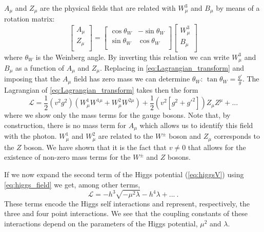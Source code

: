 $A_{\mu}$ and $Z_{\mu}$ are the physical fields that are related with $W^3_{\mu}$ and $B_{\mu}$ by means of a rotation matrix:
\begin{equation}
\begin{bmatrix}
A_{\mu} \\
Z_{\mu} \\
\end{bmatrix}=
\begin{bmatrix}
\cos\theta_W & -\sin\theta_W \\
\sin\theta_W & \cos\theta_W \\
\end{bmatrix}
\begin{bmatrix}
W^3_{\mu} \\
B_{\mu} \\
\end{bmatrix}
\end{equation}
where $\theta_W$ is the Weinberg angle.
By inverting this relation we can write $W^3_{\mu}$ and $B_{\mu}$ as a function of $A_{\mu}$ and $Z_{\mu}$. Replacing in \ref{eq:Lagrangian_transform} and imposing that the $A_{\mu}$ field has zero mass we can determine $\theta_W$: $\tan\theta_W=\frac{g'}{g}$. The Lagrangian of \ref{eq:Lagrangian_transform} takes then the form
\begin{equation}
	\mathcal{L}=\frac{1}{2}\left(v^2g^2\right)\left(W^1_{\mu}W^{1\mu}+W^2_{\mu}W^{2\mu}\right)+\frac{1}{2}\left(v^2\left[g^2+g'^2\right]\right)Z_{\mu}Z^{\mu}+...
\end{equation}
where we show only the mass terms for the gauge bosons. Note that, by construction, there is no mass term for $A_{\mu}$ which allows us to identify this field with the photon. $W^1_{\mu}$ and $W^2_{\mu}$ are related to the $W^{\pm}$ boson and $Z_{\mu}$ corresponds to the $Z$ boson. We have shown that it is the fact that $v\neq0$ that allows for the existence of non-zero mass terms for the $W^{\pm}$ and $Z$ bosons.

If we now expand the second term of the Higgs potential (\ref{eq:higgsV}) using \ref{eq:higgs_field} we get, among other terms,
\begin{equation}
\mathcal{L}=-h^3\sqrt{-\mu^2 \lambda} - h^4\lambda+...~.
\label{eq:higgs_couplings}
\end{equation}
These terms encode the Higgs self interactions and represent, respectively, the three and four point interactions. We see that the coupling constants of these interactions depend on the parameters of the Higgs potential, $\mu^2$ and $\lambda$.


